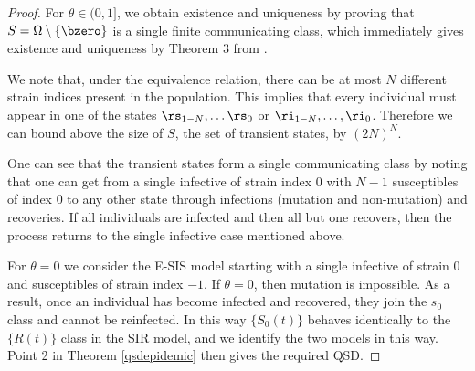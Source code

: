 \documentclass[smallextended]{svjour3}       %
\begin{document}
\begin{proof}
	For $\theta \in (0,1]$, we obtain existence and uniqueness by proving that $S=\Omega\setminus\{\bzero\}$ is a single finite communicating class, which immediately gives existence and uniqueness by Theorem 3 from \cite{vanDoorn2013}. 
	
	We note that, under the equivalence relation, there can be at most $N$ different strain indices present in the population. This implies that every individual must appear in one of the states $\rs_{1-N},\dots \rs_0$ or $\ri_{1-N},\dots, \ri_0$. Therefore we can bound above the size of $S$, the set of transient states, by $(2N)^N$. 
	
	One can see that the transient states form a single communicating class by noting that one can get from a single infective of strain index $0$ with $N-1$ susceptibles of index 0 to any other state through infections (mutation and non-mutation) and recoveries. If all individuals are infected and then all but one recovers, then the process returns to the single infective case mentioned above.
	
	For $\theta = 0$ we consider the E-SIS model starting with a single infective of strain $0$ and susceptibles of strain index $-1$. If $\theta = 0$, then mutation is impossible. As a result, once an individual has become infected and recovered, they join the $s_0$ class and cannot be reinfected. In this way $\{S_0(t)\}$ behaves identically to the $\{R(t)\}$ class in the SIR model, and we identify the two models in this way. Point 2 in Theorem \ref{qsdepidemic} then gives the required QSD.
\end{proof}
\end{document}

